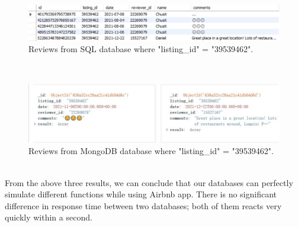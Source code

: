 \documentclass{article}
\begin{document}
	\\
	\begin{figure}[h]
		\centering
		\includegraphics[width=.6\textheight]{sql_result_1.jpg}
		\caption{Reviews from SQL database where "listing\_id" = "39539462".}
		\label{fig:016}
	\end{figure}
	\\
	\begin{figure}[h]
		\centering
		\includegraphics[width=.5\textheight]{query_mongo_1.jpg}
		\caption{Reviews from MongoDB database where "listing\_id" = "39539462".}
		\label{fig:017}
	\end{figure}
	\\
	From the above three results, we can conclude that our databases can perfectly simulate different functions while using Airbnb app. There is no significant difference in response time between two databases; both of them reacts very quickly within a second.  
\end{document}
